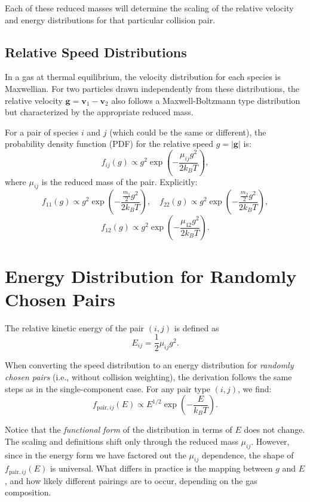 Each of these reduced masses will determine the scaling of the relative velocity and energy distributions for that particular collision pair.

\subsection{Relative Speed Distributions}

In a gas at thermal equilibrium, the velocity distribution for each species is Maxwellian. For two particles drawn independently from these distributions, the relative velocity \(\mathbf{g} = \mathbf{v}_1 - \mathbf{v}_2\) also follows a Maxwell-Boltzmann type distribution but characterized by the appropriate reduced mass.

For a pair of species \( i \) and \( j \) (which could be the same or different), the probability density function (PDF) for the relative speed \( g = |\mathbf{g}| \) is:
\[
f_{ij}(g) \propto g^{2} \exp\left(-\frac{\mu_{ij} g^{2}}{2 k_B T}\right),
\]
where \(\mu_{ij}\) is the reduced mass of the pair. Explicitly:
\[
f_{11}(g) \propto g^{2} \exp\left(-\frac{\frac{m_1}{2} g^{2}}{2 k_B T}\right), \quad
f_{22}(g) \propto g^{2} \exp\left(-\frac{\frac{m_2}{2} g^{2}}{2 k_B T}\right),
\]
\[
f_{12}(g) \propto g^{2} \exp\left(-\frac{\mu_{12} g^{2}}{2 k_B T}\right).
\]

\section{Energy Distribution for Randomly Chosen Pairs}

The relative kinetic energy of the pair \( (i,j) \) is defined as
\[
E_{ij} = \frac{1}{2}\mu_{ij} g^{2}.
\]

When converting the speed distribution to an energy distribution for \emph{randomly chosen pairs} (i.e., without collision weighting), the derivation follows the same steps as in the single-component case. For any pair type \( (i,j) \), we find:
\[
f_{\text{pair},ij}(E) \propto E^{1/2} \exp\left(-\frac{E}{k_B T}\right).
\]

Notice that the \emph{functional form} of the distribution in terms of \( E \) does not change. The scaling and definitions shift only through the reduced mass \(\mu_{ij}\). However, since in the energy form we have factored out the \(\mu_{ij}\) dependence, the shape of \( f_{\text{pair},ij}(E) \) is universal. What differs in practice is the mapping between \( g \) and \( E \), and how likely different pairings are to occur, depending on the gas composition.

